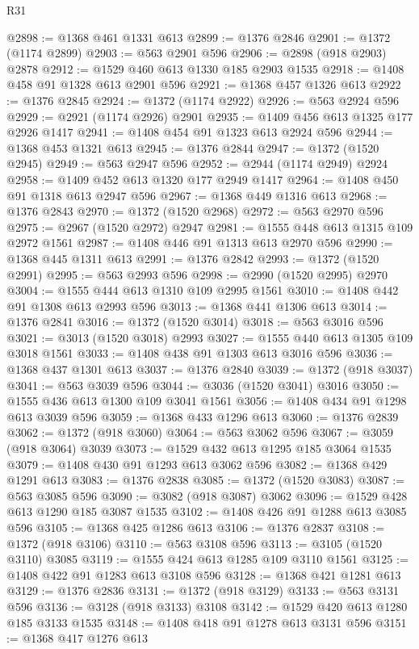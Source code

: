 \begin{lexlean}{R31}
\begin{coremodule}
@2898 := @1368 @461 @1331 @613
@2899 := @1376 @2846
@2901 := @1372 (@1174 @2899)
@2903 := @563 @2901 @596
@2906 := @2898 (@918 @2903) @2878
@2912 := @1529 @460 @613 @1330 @185 @2903 @1535
@2918 := @1408 @458 @91 @1328 @613 @2901 @596
@2921 := @1368 @457 @1326 @613
@2922 := @1376 @2845
@2924 := @1372 (@1174 @2922)
@2926 := @563 @2924 @596
@2929 := @2921 (@1174 @2926) @2901
@2935 := @1409 @456 @613 @1325 @177 @2926 @1417
@2941 := @1408 @454 @91 @1323 @613 @2924 @596
@2944 := @1368 @453 @1321 @613
@2945 := @1376 @2844
@2947 := @1372 (@1520 @2945)
@2949 := @563 @2947 @596
@2952 := @2944 (@1174 @2949) @2924
@2958 := @1409 @452 @613 @1320 @177 @2949 @1417
@2964 := @1408 @450 @91 @1318 @613 @2947 @596
@2967 := @1368 @449 @1316 @613
@2968 := @1376 @2843
@2970 := @1372 (@1520 @2968)
@2972 := @563 @2970 @596
@2975 := @2967 (@1520 @2972) @2947
@2981 := @1555 @448 @613 @1315 @109 @2972 @1561
@2987 := @1408 @446 @91 @1313 @613 @2970 @596
@2990 := @1368 @445 @1311 @613
@2991 := @1376 @2842
@2993 := @1372 (@1520 @2991)
@2995 := @563 @2993 @596
@2998 := @2990 (@1520 @2995) @2970
@3004 := @1555 @444 @613 @1310 @109 @2995 @1561
@3010 := @1408 @442 @91 @1308 @613 @2993 @596
@3013 := @1368 @441 @1306 @613
@3014 := @1376 @2841
@3016 := @1372 (@1520 @3014)
@3018 := @563 @3016 @596
@3021 := @3013 (@1520 @3018) @2993
@3027 := @1555 @440 @613 @1305 @109 @3018 @1561
@3033 := @1408 @438 @91 @1303 @613 @3016 @596
@3036 := @1368 @437 @1301 @613
@3037 := @1376 @2840
@3039 := @1372 (@918 @3037)
@3041 := @563 @3039 @596
@3044 := @3036 (@1520 @3041) @3016
@3050 := @1555 @436 @613 @1300 @109 @3041 @1561
@3056 := @1408 @434 @91 @1298 @613 @3039 @596
@3059 := @1368 @433 @1296 @613
@3060 := @1376 @2839
@3062 := @1372 (@918 @3060)
@3064 := @563 @3062 @596
@3067 := @3059 (@918 @3064) @3039
@3073 := @1529 @432 @613 @1295 @185 @3064 @1535
@3079 := @1408 @430 @91 @1293 @613 @3062 @596
@3082 := @1368 @429 @1291 @613
@3083 := @1376 @2838
@3085 := @1372 (@1520 @3083)
@3087 := @563 @3085 @596
@3090 := @3082 (@918 @3087) @3062
@3096 := @1529 @428 @613 @1290 @185 @3087 @1535
@3102 := @1408 @426 @91 @1288 @613 @3085 @596
@3105 := @1368 @425 @1286 @613
@3106 := @1376 @2837
@3108 := @1372 (@918 @3106)
@3110 := @563 @3108 @596
@3113 := @3105 (@1520 @3110) @3085
@3119 := @1555 @424 @613 @1285 @109 @3110 @1561
@3125 := @1408 @422 @91 @1283 @613 @3108 @596
@3128 := @1368 @421 @1281 @613
@3129 := @1376 @2836
@3131 := @1372 (@918 @3129)
@3133 := @563 @3131 @596
@3136 := @3128 (@918 @3133) @3108
@3142 := @1529 @420 @613 @1280 @185 @3133 @1535
@3148 := @1408 @418 @91 @1278 @613 @3131 @596
@3151 := @1368 @417 @1276 @613

\end{coremodule}
\end{lexlean}
